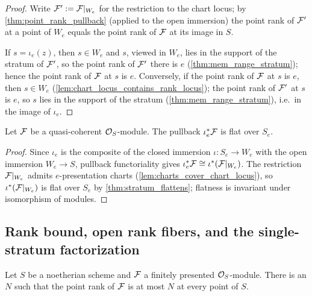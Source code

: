 \begin{proof}
  \leanok
  Write \(\mathcal{F}' := \mathcal{F}|_{W_e}\) for the restriction to the chart locus; by
  \cref{thm:point_rank_pullback} (applied to the open immersion) the point
  rank of \(\mathcal{F}'\) at a point of \(W_e\) equals the point rank of \(\mathcal{F}\) at
  its image in \(S\).

  If \(s = \iota_e(z)\), then \(s \in W_e\) and \(s\), viewed in \(W_e\),
  lies in the support of the stratum of \(\mathcal{F}'\), so the point rank of
  \(\mathcal{F}'\) there is \(e\) (\cref{thm:mem_range_stratum}); hence the point
  rank of \(\mathcal{F}\) at \(s\) is \(e\).  Conversely, if the point rank of
  \(\mathcal{F}\) at \(s\) is \(e\), then \(s \in W_e\)
  (\cref{lem:chart_locus_contains_rank_locus}); the point rank of \(\mathcal{F}'\)
  at \(s\) is \(e\), so \(s\) lies in the support of the stratum
  (\cref{thm:mem_range_stratum}), i.e.\ in the image of \(\iota_e\).
\end{proof}

\begin{theorem}
  \label{thm:rank_stratum_flattens}
  \leanok
  Let \(\mathcal{F}\) be a quasi-coherent \(\mathcal{O}_S\)-module.  The pullback
  \(\iota_e^*\mathcal{F}\) is flat over \(S_e\).
\end{theorem}

\begin{proof}
  \leanok
  Since \(\iota_e\) is the composite of the closed immersion
  \(\iota : S_e \to W_e\) with the open immersion \(W_e \to S\), pullback
  functoriality gives \(\iota_e^*\mathcal{F} \cong \iota^*(\mathcal{F}|_{W_e})\).  The
  restriction \(\mathcal{F}|_{W_e}\) admits \(e\)-presentation charts
  (\cref{lem:charts_cover_chart_locus}), so \(\iota^*(\mathcal{F}|_{W_e})\) is flat
  over \(S_e\) by \cref{thm:stratum_flattens}; flatness is invariant under
  isomorphism of modules.
\end{proof}

\subsection{Rank bound, open rank fibers, and the single-stratum
  factorization}

\begin{lemma}
  \label{lem:point_rank_bounded}
  \leanok
  Let \(S\) be a noetherian scheme and \(\mathcal{F}\) a finitely presented
  \(\mathcal{O}_S\)-module.  There is an \(N\) such that the point rank of \(\mathcal{F}\)
  is at most \(N\) at every point of \(S\).
\end{lemma}

